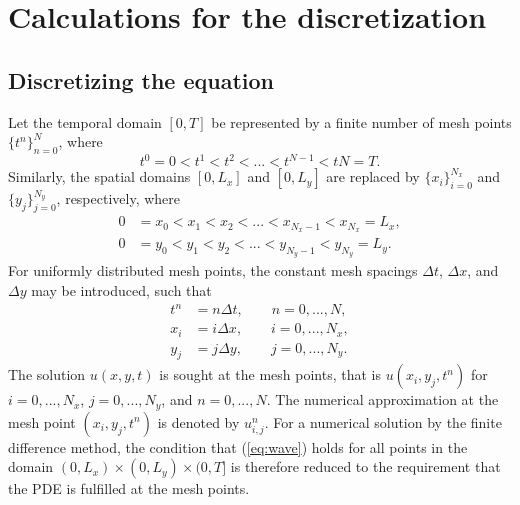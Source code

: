 \documentclass[twoside]{article}
\begin{document}
\appendix
\section{Calculations for the discretization}
\label{app:A}
\subsection{Discretizing the equation}
Let the temporal domain $\left[0, T\right]$ be represented by a finite number of mesh points $\{t^n\}_{n=0}^N$, where
\begin{equation*}
t^0 = 0 < t^1< t^2 < ... < t^{N-1} < tN = T.
\end{equation*}
Similarly, the spatial domains $\left[0,L_x \right]$ and $\left[0,L_y \right]$ are replaced by  $\{x_i\}_{i=0}^{N_x}$ and $\{y_j\}_{j=0}^{N_y}$, respectively, where
\begin{align*}
0 &= x_0 < x_1 < x_2 < ... < x_{N_x - 1} < x_{N_x} = L_x, \\
0 &= y_0 < y_1 < y_2 < ... < y_{N_y - 1} < y_{N_y} = L_y.
\end{align*}
For uniformly distributed mesh points, the constant mesh spacings $\Delta t$, $\Delta x$, and $\Delta y$ may be introduced, such that
\begin{align*}
t^n &= n \Delta t, \qquad n = 0, ..., N, \\
x_i &= i \Delta x, \qquad i = 0, ..., N_x, \\
y_j &= j \Delta y, \qquad j = 0, ..., N_y.
\end{align*}
The solution $u(x,y,t)$ is sought at the mesh points, that is $u(x_i, y_j, t^n)$ for $i = 0, ..., N_x$, $j = 0, ..., N_y$, and $n = 0, ..., N$. The numerical approximation at the mesh point $(x_i, y_j, t^n)$ is denoted by $u_{i,j}^n$.
For a numerical solution by the finite difference method, the condition that (\ref{eq:wave}) holds for all points in the domain $(0, L_x) \times (0, L_y) \times (0, T]$ is therefore reduced to the requirement that the PDE is fulfilled at the mesh points.
\end{document}
